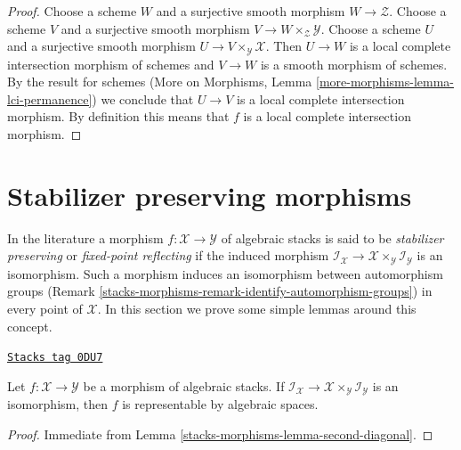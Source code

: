 \begin{proof}
Choose a scheme $W$ and a surjective smooth morphism $W \to \mathcal{Z}$.
Choose a scheme $V$ and a surjective smooth morphism
$V \to W \times_\mathcal{Z} \mathcal{Y}$.
Choose a scheme $U$ and a surjective smooth morphism
$U \to V \times_\mathcal{Y} \mathcal{X}$.
Then $U \to W$ is a local complete intersection morphism of schemes and
$V \to W$ is a smooth morphism of schemes. By the result for schemes
(More on Morphisms, Lemma \ref{more-morphisms-lemma-lci-permanence})
we conclude that $U \to V$ is a local complete intersection morphism.
By definition this means that $f$ is a local complete intersection morphism.
\end{proof}

\section{Stabilizer preserving morphisms}
\label{stacks-morphisms-section-stabilizer-preserving}
In the literature a morphism $f : \mathcal{X} \to \mathcal{Y}$ of algebraic
stacks is said to be {\it stabilizer preserving} or
{\it fixed-point reflecting} if the induced morphism
$\mathcal{I}_\mathcal{X} \to
\mathcal{X} \times_\mathcal{Y} \mathcal{I}_\mathcal{Y}$
is an isomorphism. Such a morphism induces an isomorphism
between automorphism groups (Remark \ref{stacks-morphisms-remark-identify-automorphism-groups})
in every point of $\mathcal{X}$.
In this section we prove some simple lemmas around this concept.

\begin{lemma}
\label{stacks-morphisms-lemma-stabilizer-preserving}
\href{https://stacks.math.columbia.edu/tag/0DU7}{\texttt{Stacks tag 0DU7}}

Let $f : \mathcal{X} \to \mathcal{Y}$ be a morphism of algebraic stacks.
If $\mathcal{I}_\mathcal{X} \to
\mathcal{X} \times_\mathcal{Y} \mathcal{I}_\mathcal{Y}$ is an isomorphism,
then $f$ is representable by algebraic spaces.
\end{lemma}

\begin{proof}
Immediate from Lemma \ref{stacks-morphisms-lemma-second-diagonal}.
\end{proof}

